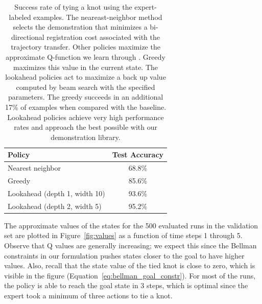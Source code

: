 \begin{table}
  \centering
  \begin{tabular}{lc}
    \toprule
      Policy & Test Accuracy\\
    \midrule
      Nearest neighbor \cite{Schulmanetal_ISRR2013} & 68.8\% \\
    \midrule
      Greedy & 85.6\% \\
      Lookahead (depth 1, width 10) & 93.6\% \\
      Lookahead (depth 2, width 5) & 95.2\% \\
    \bottomrule
  \end{tabular}
  \caption{Success rate of tying a knot using the expert-labeled examples. The neareast-neighbor method selects
           the demonstration that minimizes a bi-directional registration cost associated with the trajectory transfer.
           Other policies maximize the approximate Q-function we learn through \mmql{}. Greedy maximizes this value in the current
           state. The lookahead policies act to maximize a back up value computed by beam search with the specified parameters. The greedy
           succeeds in an additional 17\% of examples when compared with the baseline. Lookahead policies achieve very high performance rates
           and approach the best possible with our demonstration library.}
  \label{table:performance}
\end{table}

The approximate values of the states for the 500 evaluated runs in the validation set are plotted in Figure~\ref{fig:values} as a function of time steps 1 through 5.
Observe that Q values are generally increasing; we expect this since the Bellman constraints in our formulation pushes states closer to the goal to have higher values.
Also, recall that the state value of the tied knot is close to zero, which is visible in the figure (Equation~\ref{eq:bellman_goal_constr}).
For most of the runs, the policy is able to reach the goal state in 3 steps, which is optimal since the expert took a minimum of three actions to tie a knot.

